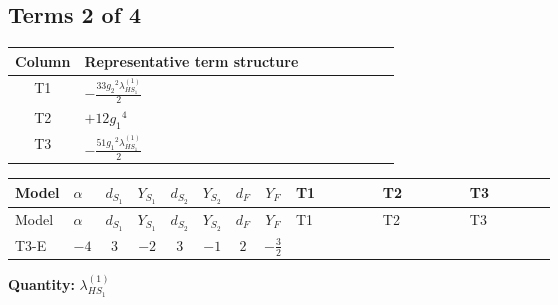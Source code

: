 \documentclass[8pt]{article}
\begin{document}
\begin{landscape}
\subsection*{Terms 2 of 4}
\begin{center}
\begin{tabular}{@{}c >{\raggedright\arraybackslash}p{0.82\linewidth}@{}}
\toprule
Column & Representative term structure \\
\midrule
T1 & \(\displaystyle -\frac{33 {g_2}^2 {\lambda_{HS_1}^{(1)}}}{2}\) \\
\midrule
T2 & \(\displaystyle +12 {g_1}^4\) \\
\midrule
T3 & \(\displaystyle -\frac{51 {g_1}^2 {\lambda_{HS_1}^{(1)}}}{2}\) \\
\midrule
\bottomrule
\end{tabular}
\end{center}
\smallskip
\tiny
\begin{longtable}{@{}llcccccc >{\raggedright\arraybackslash}p{0.21\linewidth} >{\raggedright\arraybackslash}p{0.21\linewidth} >{\raggedright\arraybackslash}p{0.21\linewidth}@{}}
\toprule
Model & $\alpha$ & $d_{S_1}$ & $Y_{S_1}$ & $d_{S_2}$ & $Y_{S_2}$ & $d_F$ & $Y_F$ & T1 & T2 & T3 \\
\midrule
\endfirsthead
\toprule
Model & $\alpha$ & $d_{S_1}$ & $Y_{S_1}$ & $d_{S_2}$ & $Y_{S_2}$ & $d_F$ & $Y_F$ & T1 & T2 & T3 \\
\midrule
\endhead
T3-E & $-4$ & $3$ & $-2$ & $3$ & $-1$ & $2$ & $-\frac{3}{2}$ & \scriptsize\adjustbox{max width=\linewidth}{$\begin{gathered} -\frac{33 {g_2}^2 {\lambda_{HS_1}^{(1)}}}{2}\end{gathered}$} & \scriptsize\adjustbox{max width=\linewidth}{$\begin{gathered} +12 {g_1}^4\end{gathered}$} & \scriptsize\adjustbox{max width=\linewidth}{$\begin{gathered} -\frac{51 {g_1}^2 {\lambda_{HS_1}^{(1)}}}{2}\end{gathered}$} \\
\midrule
\bottomrule
\end{longtable}
\clearpage
\noindent\textbf{Quantity: }$\lambda_{HS_1}^{(1)}$\par\smallskip

\end{landscape}
\end{document}
